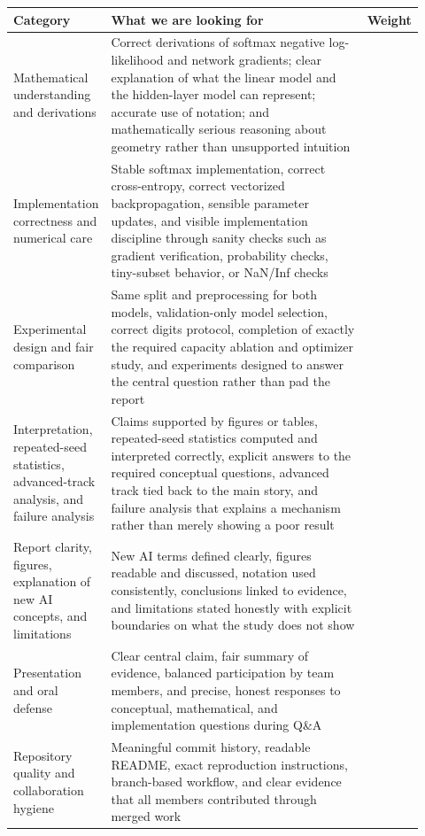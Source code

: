 \documentclass[11pt]{article}
\begin{document}
\begin{tabularx}{\linewidth}{>{\raggedright\arraybackslash}p{0.14\linewidth} >{\raggedright\arraybackslash}p{0.66\linewidth} >{\raggedleft\arraybackslash}p{0.12\linewidth}}
\toprule
\textbf{Category} & \textbf{What we are looking for} & \textbf{Weight} \\
\midrule
Mathematical understanding and derivations & Correct derivations of softmax negative log-likelihood and network gradients; clear explanation of what the linear model and the hidden-layer model can represent; accurate use of notation; and mathematically serious reasoning about geometry rather than unsupported intuition & 20 \\
Implementation correctness and numerical care & Stable softmax implementation, correct cross-entropy, correct vectorized backpropagation, sensible parameter updates, and visible implementation discipline through sanity checks such as gradient verification, probability checks, tiny-subset behavior, or NaN/Inf checks & 16 \\
Experimental design and fair comparison & Same split and preprocessing for both models, validation-only model selection, correct digits protocol, completion of exactly the required capacity ablation and optimizer study, and experiments designed to answer the central question rather than pad the report & 18 \\
Interpretation, repeated-seed statistics, advanced-track analysis, and failure analysis & Claims supported by figures or tables, repeated-seed statistics computed and interpreted correctly, explicit answers to the required conceptual questions, advanced track tied back to the main story, and failure analysis that explains a mechanism rather than merely showing a poor result & 18 \\
Report clarity, figures, explanation of new AI concepts, and limitations & New AI terms defined clearly, figures readable and discussed, notation used consistently, conclusions linked to evidence, and limitations stated honestly with explicit boundaries on what the study does not show & 10 \\
Presentation and oral defense & Clear central claim, fair summary of evidence, balanced participation by team members, and precise, honest responses to conceptual, mathematical, and implementation questions during Q\&A & 10 \\
Repository quality and collaboration hygiene & Meaningful commit history, readable README, exact reproduction instructions, branch-based workflow, and clear evidence that all members contributed through merged work & 8 \\
\bottomrule
\end{tabularx}
\end{document}
